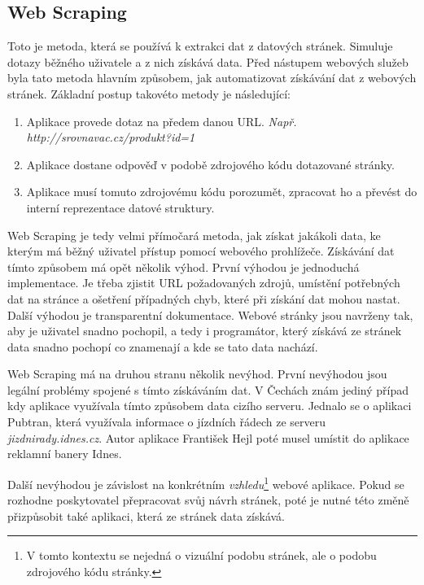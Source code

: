 \subsection{Web Scraping}
\label{sec:webscraping}
Toto je metoda, která se používá k extrakci dat z datových stránek. Simuluje dotazy běžného uživatele a z nich získává data. Před nástupem webových služeb byla tato metoda hlavním způsobem, jak automatizovat získávání dat z webových stránek\cite{oreilly2007web}. Základní postup takovéto metody je následující:

\begin{enumerate}
\item Aplikace provede dotaz na předem danou URL. \newline \emph{Např. http://srovnavac.cz/produkt?id=1}
\item Aplikace dostane odpověď v podobě zdrojového kódu dotazované stránky.
\item Aplikace musí tomuto zdrojovému kódu porozumět, zpracovat ho a převést do interní reprezentace datové struktury.
\end{enumerate}

Web Scraping je tedy velmi přímočará metoda, jak získat jakákoli data, ke kterým má běžný uživatel přístup pomocí webového prohlížeče. Získávání dat tímto způsobem má opět několik výhod. První výhodou je jednoduchá implementace. Je třeba zjistit URL požadovaných zdrojů, umístění potřebných dat na stránce a ošetření případných chyb, které při získání dat mohou nastat. Další výhodou je transparentní dokumentace. Webové stránky jsou navrženy tak, aby je uživatel snadno pochopil, a tedy i programátor, který získává ze stránek data snadno pochopí co znamenají a kde se tato data nachází.

Web Scraping má na druhou stranu několik nevýhod. První nevýhodou jsou legální problémy spojené s tímto získáváním dat. V Čechách znám jediný případ kdy aplikace využívala tímto způsobem data cizího serveru. Jednalo se o aplikaci Pubtran, která využívala informace o jízdních řádech ze serveru \emph{jizdnirady.idnes.cz}. Autor aplikace František Hejl poté musel umístit do aplikace reklamní banery Idnes.

Další nevýhodou je závislost na konkrétním \emph{vzhledu}\footnote{V tomto kontextu se nejedná o vizuální podobu stránek, ale o podobu zdrojového kódu stránky.} webové aplikace. Pokud se rozhodne poskytovatel přepracovat svůj návrh stránek, poté je nutné této změně přizpůsobit také aplikaci, která ze stránek data získává.

